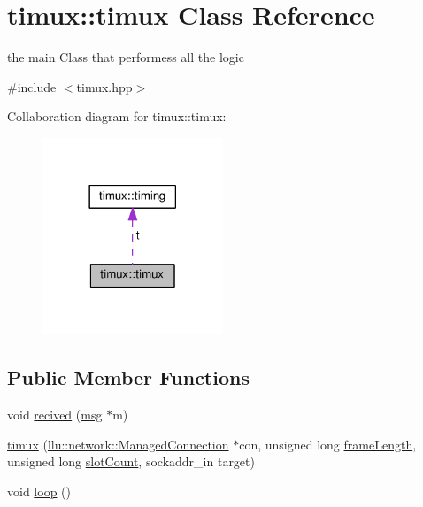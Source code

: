 \hypertarget{classtimux_1_1timux}{\section{timux\+:\+:timux Class Reference}
\label{classtimux_1_1timux}
}


the main Class that performess all the logic  




{\ttfamily \#include $<$timux.\+hpp$>$}



Collaboration diagram for timux\+:\+:timux\+:
\nopagebreak
\begin{figure}[H]
\begin{center}
\leavevmode
\includegraphics[width=153pt]{classtimux_1_1timux__coll__graph}
\end{center}
\end{figure}
\subsection*{Public Member Functions}
\begin{DoxyCompactItemize}
\item 
void \hyperlink{classtimux_1_1timux_ac732153dc6019d7ddd3aa93fdffcfc6f}{recived} (\hyperlink{structtimux_1_1msg}{msg} $\ast$m)
\item 
\hyperlink{classtimux_1_1timux_a84e972805455951e68973856c91d8bb4}{timux} (\hyperlink{classllu_1_1network_1_1_managed_connection}{llu\+::network\+::\+Managed\+Connection} $\ast$con, unsigned long \hyperlink{classtimux_1_1timux_aac1a2022c0fc41f5ce690f40037af2cf}{frame\+Length}, unsigned long \hyperlink{classtimux_1_1timux_a3c8195dcabf2a776759b09f66e08bc80}{slot\+Count}, sockaddr\+\_\+in target)
\item 
void \hyperlink{classtimux_1_1timux_aedd4f1380074ca99661aa8ba142d5b72}{loop} ()
\end{DoxyCompactItemize}
